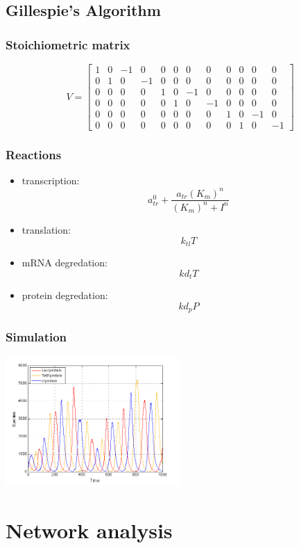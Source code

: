 \documentclass{beamer}
\begin{document}
\subsection{Gillespie's Algorithm}
\begin{frame}
  \frametitle{Stoichiometric matrix}
  \[ V = 
  \begin{bmatrix}
  1 & 0 & -1 & 0 & 0 & 0 & 0 & 0 & 0 & 0 & 0 & 0 \\
  0 & 1 & 0 & -1 & 0 & 0 & 0 & 0 & 0 & 0 & 0 & 0 \\
  0 & 0 & 0 & 0 & 1 & 0 & -1 & 0 & 0 & 0 & 0 & 0 \\
  0 & 0 & 0 & 0 & 0 & 1 & 0 & -1 & 0 & 0 & 0 & 0 \\
  0 & 0 & 0 & 0 & 0 & 0 & 0 & 0 & 1 & 0 & -1 & 0 \\
  0 & 0 & 0 & 0 & 0 & 0 & 0 & 0 & 0 & 1 & 0 & -1 
  \end{bmatrix}
  \]
\end{frame}
\begin{frame}
  \frametitle{Reactions}
  \begin{itemize}
    \item transcription: \[a_{tr}^0 + \frac{a_{tr} (K_m)^n}{(K_m)^n+I^n}\]
    \item translation: \[k_{tl} T\]
    \item mRNA degredation: \[kd_t T\]
    \item protein degredation: \[kd_p P\]
  \end{itemize}
\end{frame}
\begin{frame}
  \frametitle{Simulation}
  \begin{center}
    \includegraphics[width=250px]{../results.png}
  \end{center}
\end{frame}

\section{Network analysis}
\end{document}
